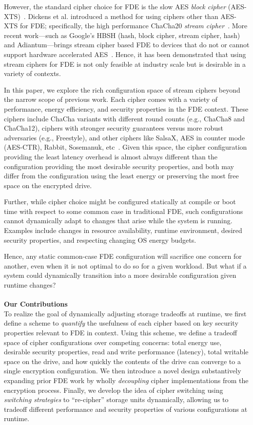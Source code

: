 However, the standard cipher choice for FDE is the slow AES \emph{block cipher}
(AES-XTS)~\cite{XTS, XTSComments, NISTXTS}. Dickens et al. introduced a method
for using ciphers other than AES-XTS for FDE; specifically, the high performance
ChaCha20 \emph{stream cipher}~\cite{StrongBox, ChaCha20}. More recent
work---such as Google's HBSH (hash, block cipher, stream cipher, hash) and
Adiantum---brings stream cipher based FDE to devices that do not or cannot
support hardware accelerated AES~\cite{Adiantum}. Hence, it has been
demonstrated that using stream ciphers for FDE is not only feasible at industry
scale but is desirable in a variety of contexts.

In this paper, we explore the rich configuration space of stream ciphers beyond
the narrow scope of previous work. Each cipher comes with a variety of
performance, energy efficiency, and security properties in the FDE context.
These ciphers include ChaCha variants with different round counts (e.g., ChaCha8
and ChaCha12), ciphers with stronger security guarantees versus more robust
adversaries (e.g., Freestyle), and other ciphers like SalsaX, AES in counter
mode (AES-CTR), Rabbit, Sosemanuk, etc~\cite{Freestyle, SalsaX, Rabbit,
Sosemanuk, ChaCha20, AESCTR}. Given this space, the cipher configuration
providing the least latency overhead is almost always different than the
configuration providing the most desirable security properties, and both may
differ from the configuration using the least energy or preserving the most free
space on the encrypted drive.

Further, while cipher choice might be configured statically at compile or boot
time with respect to some common case in traditional FDE, such configurations
cannot dynamically adapt to changes that arise while the system is running.
Examples include changes in resource availability, runtime environment, desired
security properties, and respecting changing OS energy budgets.

Hence, any static common-case FDE configuration will sacrifice one concern for
another, even when it is not optimal to do so for a given workload. But what if
a system could dynamically transition into a more desirable configuration given
runtime changes?\\
\\
\textbf{Our Contributions}\\
To realize the goal of dynamically adjusting storage tradeoffs at runtime, we
first define a scheme to \emph{quantify} the usefulness of each cipher based on
key security properties relevant to FDE in context. Using this scheme, we define
a tradeoff space of cipher configurations over competing concerns: total energy
use, desirable security properties, read and write performance (latency), total
writable space on the drive, and how quickly the contents of the drive can
converge to a single encryption configuration. We then introduce a novel design
substantively expanding prior FDE work by wholly \emph{decoupling} cipher
implementations from the encryption process. Finally, we develop the idea of
cipher switching using \emph{switching strategies} to ``re-cipher'' storage
units dynamically, allowing us to tradeoff different performance and security
properties of various configurations at runtime.

